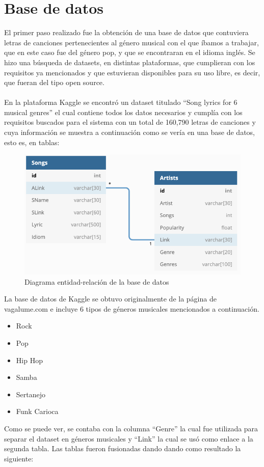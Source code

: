 \documentclass[12pt, a4paper, titlepage]{article}
\begin{document}
	\section{Base de datos}
	El primer paso realizado fue la obtención de una base de datos que contuviera letras de canciones pertenecientes al género musical con el que íbamos a trabajar, que en este caso fue del género pop, y que se encontraran en el idioma inglés. Se hizo una búsqueda de datasets, en distintas plataformas, que cumplieran con los requisitos ya mencionados y que estuvieran disponibles para su uso libre, es decir, que fueran del tipo open source.\\\\
	En la plataforma Kaggle \cite{kaggle} se encontró un dataset titulado “Song lyrics for 6 musical genres” \cite{kaggleDataset} el cual contiene todos los datos necesarios y cumplía con los requisitos buscados para el sistema con un total de 160,790 letras de canciones y cuya información se muestra a continuación como se vería en una base de datos, esto es, en tablas: 
	\begin{figure}[H]
		\includegraphics[width=12cm]{./Imagenes/BasedeDatos/diagrama_ER_BD.jpg}
		\centering 
		\caption{Diagrama entidad-relación de la base de datos}
	\end{figure}
	La base de datos de Kaggle se obtuvo originalmente de la página de vagalume.com \cite{vagalume} e incluye 6 tipos de géneros musicales mencionados a continuación.
	\begin{itemize}
		\item Rock
		\item Pop
		\item Hip Hop
		\item Samba
		\item Sertanejo
		\item Funk Carioca
	\end{itemize}
	Como se puede ver, se contaba con la columna “Genre” la cual fue utilizada para separar el dataset en géneros musicales y “Link” la cual se usó como enlace a la segunda tabla. Las tablas fueron fusionadas dando dando como resultado la siguiente:
\end{document}
